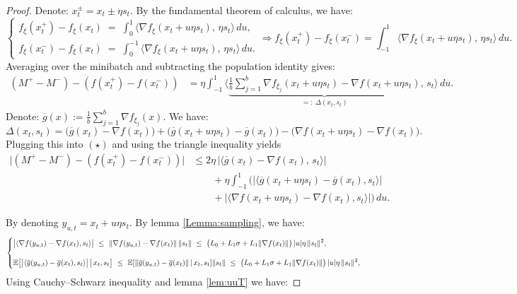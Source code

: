 \documentclass[twoside]{article}
\theoremstyle{plain}
\theoremstyle{definition}
\theoremstyle{remark}
\begin{document}
\begin{proof}
Denote: $x_t^\pm=x_t\pm\eta s_t$.  By the fundamental theorem of calculus, we have:
$$\begin{cases}
f_\xi(x_t^+)-f_\xi(x_t)
\;=\;\int_0^{1}\!\!\!\big\langle \nabla f_\xi(x_t+u \eta s_t),\,\eta s_t\big\rangle\,du,
\\
f_\xi(x_t^-)-f_\xi(x_t)
\;=\;\int_0^{-1}\!\!\!\big\langle \nabla f_\xi(x_t+u \eta s_t),\,\eta s_t\big\rangle\,du.
\end{cases} \Longrightarrow f_\xi(x_t^+)-f_\xi(x_t^-)= \int_{-1}^{1}\!\!\!\big\langle \nabla f_\xi(x_t+u \eta s_t),\,\eta s_t\big\rangle\,du.
$$
Averaging over the minibatch and subtracting the population identity gives:
\begin{align*}
(M^+-M^-) - (f(x_t^+)-f(x_t^-))
&= \eta\int_{-1}^{1}\!\Big\langle \underbrace{\tfrac1b\sum_{j=1}^b\nabla f_{\xi_j}(x_t+u \eta s_t)-\nabla f(x_t+u \eta s_t)}_{=:~\Delta(x_t,s_t)},\,s_t\Big\rangle\,du. \tag{$\star$}
\end{align*}
\noindent
Denote:
$\overline g(x):=\frac1b\sum_{j=1}^b\nabla f_{\xi_j}(x)$. We have:
\[
\Delta(x_t,s_t)
=\big(\overline g(x_t)-\nabla f(x_t)\big)
+\big(\overline g(x_t+u \eta s_t)-\overline g(x_t)\big)
-\big(\nabla f(x_t+u \eta s_t)-\nabla f(x_t)\big).
\]
Plugging this into $(\star)$ and using the triangle inequality yields
\begin{align*}
\big|(M^+-M^-) - (f(x_t^+)-f(x_t^-))\big|
&\le 2\eta\,\big|\langle \overline g(x_t)-\nabla f(x_t),\,s_t\rangle\big| \\
&\qquad + \eta\!\int_{-1}^{1}\!\Big(\big|\langle \overline g(x_t+u \eta s_t)-\overline g(x_t),s_t\rangle\big|
\\
&\qquad +\big|\langle \nabla f(x_t+u \eta s_t)-\nabla f(x_t),s_t\rangle\big|\Big)\,du. \tag{$\dagger$}
\end{align*}

By denoting $y_{u,t}=x_t+u \eta s_t.$  By lemma \ref{Lemma:sampling}, we have:
\begin{equation}\label{eq:grad-diff-bounds}
\begin{cases}
\displaystyle
\big|\langle \nabla f(y_{u,t}) - \nabla f(x_t), s_t \rangle\big|
~\le~
\|\nabla f(y_{u,t}) - \nabla f(x_t)\|\,\|s_t\|
~\le~
\big(L_0 + L_1\sigma + L_1\|\nabla f(x_t)\|\big)\,|u|\eta\,\|s_t\|^2,
&\hspace{-1em}\\[1.2em]
\displaystyle
\mathbb{E}\!\left[\big|\langle \overline g(y_{u,t}) - \overline g(x_t), s_t \rangle\big| \,\middle|\, x_t, s_t\right]
~\le~
\mathbb{E}\!\left[\|\overline g(y_{u,t}) - \overline g(x_t)\| \,\middle|\, x_t, s_t\right]\!\|s_t\|
~\le~
\big(L_0 + L_1\sigma + L_1\|\nabla f(x_t)\|\big)\,|u|\eta\,\|s_t\|^2,
&\hspace{-1em}
\end{cases}
\end{equation}
Using  Cauchy–Schwarz inequality and lemma \ref{lem:uuT}  we have:


\end{proof}
\end{document}
